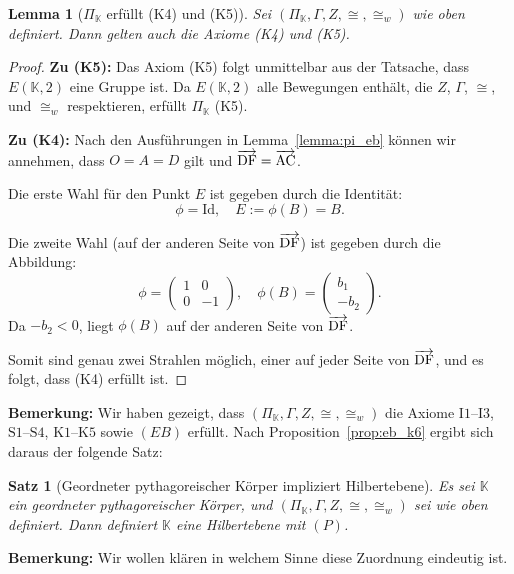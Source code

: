 \documentclass[a4paper,12pt]{article}
\theoremstyle{break}
\newtheorem{theorem}[definition]{Satz}
\newtheorem{lemma}[definition]{Lemma}
\begin{document}
\begin{lemma}[\(\Pi_\mathbb{K}\) erfüllt (K4) und (K5)]
Sei \((\Pi_\mathbb{K}, \Gamma, Z, \cong, \cong_w)\) wie oben definiert. Dann gelten auch die Axiome (K4) und (K5).
\end{lemma}

\begin{proof}
\textbf{Zu (K5):}  
Das Axiom (K5) folgt unmittelbar aus der Tatsache, dass \(E(\mathbb{K}, 2)\) eine Gruppe ist. Da \(E(\mathbb{K}, 2)\) alle Bewegungen enthält, die \(Z\), \(\Gamma\), \(\cong\), und \(\cong_w\) respektieren, erfüllt \(\Pi_\mathbb{K}\) (K5).

\textbf{Zu (K4):}  
Nach den Ausführungen in Lemma~\ref{lemma:pi_eb} können wir annehmen, dass \(O = A = D\) gilt und \(\overrightarrow{\rm DF} = \overrightarrow{\rm AC}\).  

Die erste Wahl für den Punkt \(E\) ist gegeben durch die Identität:
\[
\phi = \text{Id}, \quad E := \phi(B) = B.
\]

Die zweite Wahl (auf der anderen Seite von \(\overrightarrow{\rm DF}\)) ist gegeben durch die Abbildung:
\[
\phi = 
\begin{pmatrix}
1 & 0 \\
0 & -1
\end{pmatrix}, \quad
\phi(B) = \begin{pmatrix}
b_1 \\
-b_2
\end{pmatrix}.
\]
Da \(-b_2 < 0\), liegt \(\phi(B)\) auf der anderen Seite von \(\overrightarrow{\rm DF}\).  

Somit sind genau zwei Strahlen möglich, einer auf jeder Seite von \(\overrightarrow{\rm DF}\), und es folgt, dass (K4) erfüllt ist.
\end{proof}

\textbf{Bemerkung:}
Wir haben gezeigt, dass \((\Pi_\mathbb{K}, \Gamma, Z, \cong, \cong_w)\) die Axiome \(\text{I1--I3}\), \(\text{S1--S4}\), \(\text{K1--K5}\) sowie \((EB)\) erfüllt. Nach Proposition~\ref{prop:eb_k6} ergibt sich daraus der folgende Satz:

\begin{theorem}[Geordneter pythagoreischer Körper impliziert Hilbertebene]
Es sei \(\mathbb{K}\) ein geordneter pythagoreischer Körper, und \((\Pi_\mathbb{K}, \Gamma, Z, \cong, \cong_w)\) sei wie oben definiert. Dann definiert \(\mathbb{K}\) eine Hilbertebene mit \((P)\).
\end{theorem}

\textbf{Bemerkung:} Wir wollen klären in welchem Sinne diese Zuordnung eindeutig ist.
\end{document}
